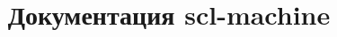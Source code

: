 \documentclass[table]{scndocument}
\begin{document}
\DeactivateBG
\title{\centering
Документация scl-machine}
\author{}
\maketitle

\normalsize

\setcounter{page}{3}

\ActivateBG
\begin{SCn}

\end{SCn}
\end{document}
